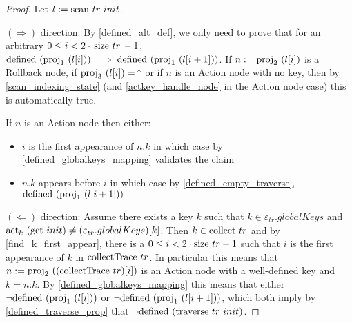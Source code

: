 \documentclass{article}
\newcommand{\textfun}[1]{\textup{#1}}
\newcommand{\traverse}[2]{\textfun{traverse}\ #1\ #2}
\newcommand{\scan}[2]{\textfun{scan}\ #1\ #2}
\newcommand{\collect}[1]{\textfun{collect}\ #1}
\newcommand{\collectTr}[1]{\textfun{collectTrace}\ #1}
\newcommand{\up}{\uparrow}
\newcommand{\defined}[1]{\textfun{defined}\ #1}
\newcommand{\get}[1]{\textfun{get}\ #1}
\newcommand{\size}[1]{\textfun{size}\ #1}
\newcommand{\fst}[1]{\textfun{proj}_1\ #1}
\newcommand{\snd}[1]{\textfun{proj}_2\ #1}
\newcommand{\trd}[1]{\textfun{proj}_3\ #1}
\newcommand{\actkey}[2]{\textfun{act}_{#1}\ #2}
\newcommand{\emptyState}[1]{\varepsilon_{#1}}
\begin{document}
\begin{proof}
    Let $l := \scan{tr}{init}$.

    $(\Rightarrow)$ direction: By \cref{defined_alt_def}, we only need to prove that for an arbitrary $0 \leq i < 2 \cdot \, \size{tr} \, - 1$,\\
     $\defined{(\fst{(l[i])})} \implies \defined{(\fst{(l[i + 1])})}$.
     If $n := \snd{(l[i])}$ is a Rollback node, if $\trd{(l[i])} =\, \up$ or if $n$ is an Action node with no key, then by \cref{scan_indexing_state} (and \cref{actkey_handle_node} in the Action node case) this is automatically true.
     
     If $n$ is an Action node then either:
     \begin{itemize}
        \item $i$ is the first appearance of $n.k$ in which case by \cref{defined_globalkeys_mapping} validates the claim
        \item $n.k$ appears before $i$ in which case by \cref{defined_empty_traverse}, $\defined{(\fst{(l[i + 1])})}$
     \end{itemize}

     $(\Leftarrow)$ direction:
     Assume there exists a key $k$ such that $k \in \emptyState{tr}.globalKeys$ and $\actkey{k}{(\get{init})} \neq (\emptyState{tr}.globalKeys)[k]$. 
     Then $k \in \collect{tr}$ and by \cref{find_k_first_appear}, there is a $0 \leq i < 2 \cdot \size{tr} - 1$ such that 
     $i$ is the first appearance of $k$ in $\collectTr{tr}$. In particular this means that $n := \snd{((\collectTr{tr})[i])}$ is an Action node with a well-defined
     key and $k = n.k$. By \cref{defined_globalkeys_mapping} this means that either $\neg{\defined{(\fst{(l[i])})}}$ or $\neg{\defined{(\fst{(l[i + 1])})}}$, which both imply by \cref{defined_traverse_prop}
     that $\neg{\defined{(\traverse{tr}{init})}}$.
\end{proof}
\end{document}
